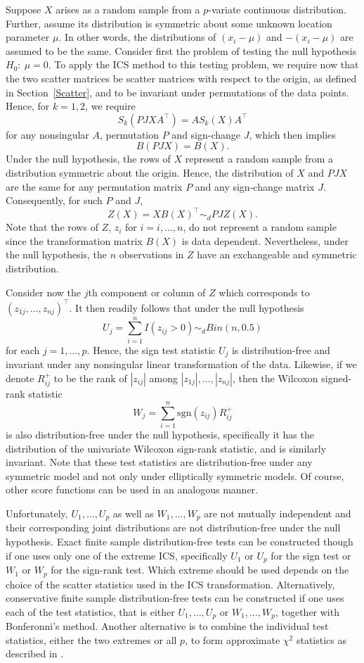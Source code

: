 \documentclass[article,nojss]{jss}
\newcommand{\sgn}{\mathrm{sgn}}
\begin{document}
Suppose $X$ arises as a random sample from a $p$-variate continuous distribution. Further, assume its distribution is
symmetric about some unknown location parameter $\mu$.  In other words, the distributions of $(x_i - \mu)$ and $-(x_i - \mu)$
are assumed to be the same. Consider first the problem of testing the null hypothesis $H_0: \ \mu = 0$.
To apply the {ICS} method to this testing problem, we require now that the two scatter matrices be scatter
matrices with respect to the origin, as defined in Section~\ref{Scatter}, and to be invariant under permutations of the
data points. Hence, for $k=1,2$, we require
\[
S_k(PJXA^\top)=AS_k(X)A^\top
\]
for any nonsingular $A$, permutation $P$ and sign-change $J$, which then implies
\[
B(PJX)=B(X).
\]
Under the null hypothesis, the rows of $X$ represent a random sample from a distribution symmetric about the origin.
Hence, the distribution of $X$ and $PJX$ are the same for any permutation matrix $P$ and any sign-change matrix $J$.
Consequently, for such $P$ and $J$,
\[
Z(X) = XB(X)^\top \sim_d PJZ(X).
\]
Note that the rows of $Z$, $z_i$ for $i = i, \ldots, n$, do not represent a random sample since the transformation
matrix $B(X)$ is data dependent.  Nevertheless, under the null hypothesis, the $n$ observations in $Z$ have an exchangeable
and symmetric distribution.

Consider now the $j$th component or column of $Z$ which corresponds to $(z_{1j}, \ldots, z_{nj})^\top$. It then readily follows that
under the null hypothesis
\[
U_j=\sum_{i=1}^{n} I(z_{ij}>0) \sim_d Bin(n,0.5)
\]
for each $j=1,\ldots,p$. Hence, the sign test statistic $U_j$ is distribution-free and invariant under any nonsingular
linear transformation of the data. Likewise, if we denote $R_{ij}^{+}$ to be the rank of $|z_{ij}|$ among
$|z_{1j}|,\ldots,|z_{nj}|$, then the Wilcoxon signed-rank statistic
\[
W_j= \sum_{i=1}^{n} \sgn(z_{ij})R_{ij}^{+}
\]
is also distribution-free under the null hypothesis, specifically it has the distribution of the univariate
Wilcoxon sign-rank statistic, and is similarly invariant. Note that these test statistics are distribution-free
under any symmetric model and not only under  elliptically symmetric models. Of course, other score functions
can be used in an analogous manner.

Unfortunately, $U_1,\ldots,U_p$ as well as $W_1,\ldots,W_p$ are not mutually independent and their corresponding joint
distributions are not distribution-free under the null hypothesis. Exact finite sample distribution-free tests can
be constructed though if one uses only one of the extreme {ICS}, specifically $U_1$ or $U_p$ for the sign test
or $W_1$ or $W_p$ for the sign-rank test.  Which extreme should be used depends on the choice of the scatter statistics used
in the {ICS} transformation. Alternatively, conservative finite sample distribution-free tests can be constructed
if one uses each of the test statistics, that is either $U_1,\ldots,U_p$ or $W_1,\ldots,W_p$, together with Bonferonni's
method. Another alternative is to combine the individual test statistics, either the two extremes or all $p$, to form
approximate $\chi^2$ statistics as described in \citet{PuriSen1971}.
\end{document}
